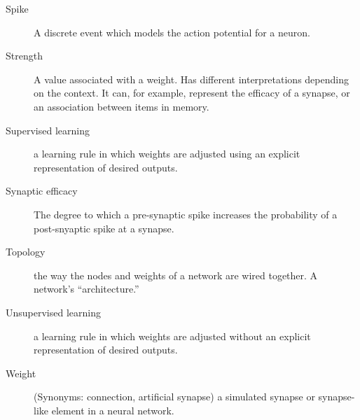 \begin{description}
\item[Spike] A discrete event which models the action potential for a neuron.
\item[Strength] A value associated with a weight. Has different interpretations depending on the context. It can, for example, represent the efficacy of a synapse, or an association between items in memory.
\item[Supervised learning] a learning rule in which weights are adjusted using an explicit representation of desired outputs.
\item[Synaptic efficacy] The degree to which a pre-synaptic spike increases the probability of a post-snyaptic spike at a synapse.
\item[Topology] the way the nodes and weights of a network are wired together. A network's ``architecture.''
\item[Unsupervised learning] a learning rule in which weights are adjusted without an explicit representation of desired outputs.
\item[Weight] (Synonyms: connection, artificial synapse) a simulated synapse or synapse-like element in a neural network. 
\end{description}